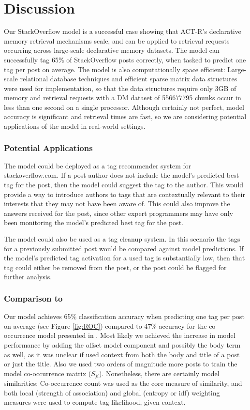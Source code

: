 \documentclass[10pt,letterpaper]{article}
\begin{document}
\section{Discussion}

Our StackOverflow model is a successful case showing that ACT-R's declarative memory retrieval mechanisms scale, and can be applied to retrieval requests occurring across large-scale declarative memory datasets. 
The model can successfully tag 65\% of StackOverflow posts correctly, when tasked to predict one tag per post on average.
The model is also computationally space efficient:
Large-scale relational database techniques and efficient sparse matrix data structures were used for implementation,
so that the data structures require only 3GB of memory and retrieval requests with a DM dataset of \num{556677795} chunks occur in less than one second on a single processor.
Although certainly not perfect, model accuracy is significant and retrieval times are fast, so we are considering potential applications of the model in real-world settings.

\subsubsection{Potential Applications}

The model could be deployed as a tag recommender system for stackoverflow.com. 
If a post author does not include the model's predicted best tag for the post, then the model could suggest the tag to the author.
This would provide a way to introduce authors to tags that are contextually relevant to their interests that they may not have been aware of.
This could also improve the answers received for the post, since other expert programmers may have only been monitoring the model's predicted best tag for the post.

The model could also be used as a tag cleanup system.
In this scenario the tags for a previously submitted post would be compared against model predictions.
If the model's predicted tag activation for a used tag is substantially low, then that tag could either be removed from the post, or the post could be flagged for further analysis.

\subsubsection{Comparison to }

Our model achieves 65\% classification accuracy when predicting one tag per post on average (see Figure \ref{fig:ROC})
compared to 47\% accuracy for the co-occurrence model presented in .
Most likely we achieved the increase in model performance by adding the offset model component and possibly the body term as well, 
as it was unclear if \citeauthor{Kuo2011} used context from both the body and title of a post or just the title.
Also we used two orders of magnitude more posts to train the model co-occurrence matrix ($S_{ji}$).
Nonetheless, there are certainly model similarities:
Co-occurrence count was used as the core measure of similarity, and both local (strength of association) and global (entropy or idf) weighting measures were used to compute tag likelihood, given context.
\end{document}
